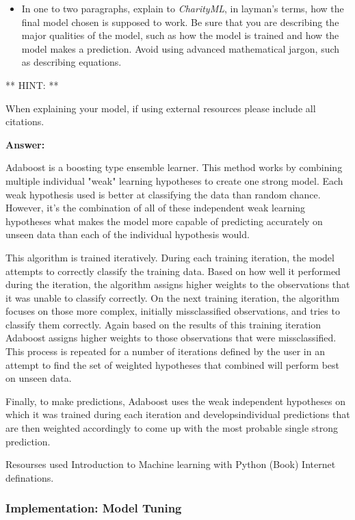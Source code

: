 \documentclass[11pt]{article}
\providecommand{\tightlist}{%
      \setlength{\itemsep}{0pt}\setlength{\parskip}{0pt}}
\begin{document}
\begin{itemize}
\tightlist
\item
  In one to two paragraphs, explain to \emph{CharityML}, in layman's
  terms, how the final model chosen is supposed to work. Be sure that
  you are describing the major qualities of the model, such as how the
  model is trained and how the model makes a prediction. Avoid using
  advanced mathematical jargon, such as describing equations.
\end{itemize}

** HINT: **

When explaining your model, if using external resources please include
all citations.

    \textbf{Answer: }

Adaboost is a boosting type ensemble learner. This method works by
combining multiple individual "weak" learning hypotheses to create one
strong model. Each weak hypothesis used is better at classifying the
data than random chance. However, it's the combination of all of these
independent weak learning hypotheses what makes the model more capable
of predicting accurately on unseen data than each of the individual
hypothesis would.

This algorithm is trained iteratively. During each training iteration,
the model attempts to correctly classify the training data. Based on how
well it performed during the iteration, the algorithm assigns higher
weights to the observations that it was unable to classify correctly. On
the next training iteration, the algorithm focuses on those more
complex, initially missclassified observations, and tries to classify
them correctly. Again based on the results of this training iteration
Adaboost assigns higher weights to those observations that were
missclassified. This process is repeated for a number of iterations
defined by the user in an attempt to find the set of weighted hypotheses
that combined will perform best on unseen data.

Finally, to make predictions, Adaboost uses the weak independent
hypotheses on which it was trained during each iteration and
developsindividual predictions that are then weighted accordingly to
come up with the most probable single strong prediction.

Resourses used Introduction to Machine learning with Python (Book)
Internet definations.

    \subsubsection{Implementation: Model
Tuning}\label{implementation-model-tuning}
\end{document}
